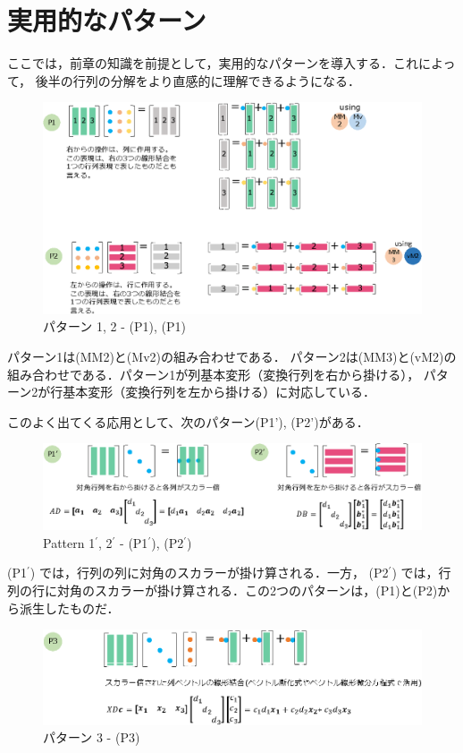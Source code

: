 \documentclass[letterpaper]{article}
\begin{document}
\section{実用的なパターン}

ここでは，前章の知識を前提として，実用的なパターンを導入する．これによって，
後半の行列の分解をより直感的に理解できるようになる．

\begin{figure}[H]
  \includegraphics[keepaspectratio, width=16cm]{Pattern12-j.eps}
  \caption{パターン 1, 2 - (P1), (P1)}
\end{figure}

パターン1は(MM2)と(Mv2)の組み合わせである．
パターン2は(MM3)と(vM2)の組み合わせである．パターン1が列基本変形（変換行列を右から掛ける），
パターン2が行基本変形（変換行列を左から掛ける）に対応している．

このよく出てくる応用として、次のパターン(P1'), (P2')がある．

\begin{figure}[H]
  \includegraphics[keepaspectratio, width=\linewidth]{Pattern11-22-j.eps}
  \caption{Pattern 1$^\prime$, 2$^\prime$ - (P1$^\prime$), (P2$^\prime$)}
\end{figure}

(P1$^\prime$) では，行列の列に対角のスカラーが掛け算される．一方，
(P2$^\prime$) では，行列の行に対角のスカラーが掛け算される．この2つのパターンは，(P1)と(P2)から派生したものだ．

\begin{figure}[H]
  \includegraphics[keepaspectratio, width=\linewidth]{Pattern3-j.eps}
  \caption{パターン 3 - (P3)}
\end{figure}
\end{document}

